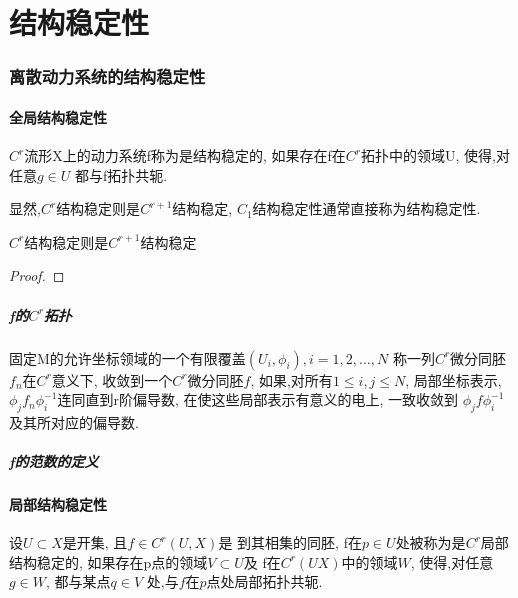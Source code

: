 \part{结构稳定性}
\section{离散动力系统的结构稳定性}

\subsection{全局结构稳定性}

\begin{definition}
    \(C^{r}\)流形X上的动力系统f称为是结构稳定的,
    如果存在f在\(C^{r}\)拓扑中的领域U,
    使得,对任意\(g\in U\)
    都与f拓扑共轭.
\end{definition}

显然,\(C^{r}\)结构稳定则是\(C^{r+1}\)结构稳定,
\(C_1\)结构稳定性通常直接称为结构稳定性.

\begin{theorem}
    \(C^{r}\)结构稳定则是\(C^{r+1}\)结构稳定
\end{theorem}

\begin{proof}

\end{proof}


\subsubsection{f的\(C^{r}\)拓扑}

固定M的允许坐标领域的一个有限覆盖\((U_i,\phi_i),i=1,2,\dots,N\)
称一列\(C^{r}\)微分同胚\(f_n\)在\(C^{r}\)意义下,
收敛到一个\(C^{r}\)微分同胚\(f\),
如果,对所有\(1\leq i,j \leq N\),
局部坐标表示,
\(\phi_j f_n \phi _i^{-1}\)连同直到r阶偏导数,
在使这些局部表示有意义的电上,
一致收敛到
\(\phi_jf\phi_i^{-1}\)
及其所对应的偏导数.

\subsubsection{f的范数的定义}


\subsection{局部结构稳定性}

\begin{definition}
    设\(U\subset X\)是开集,
    且\(f\in C^{r}(U,X)\)是
    到其相集的同胚,
    f在\(p \in U\)处被称为是\(C^{r}\)局部结构稳定的,
    如果存在p点的领域\(V\subset U\)及
    f在\(C^{r}(U X)\)中的领域\(W\),
    使得,对任意\(g\in W\),
    都与某点\(q\in V\)
    处,与\(f\)在\(p\)点处局部拓扑共轭.
\end{definition}


